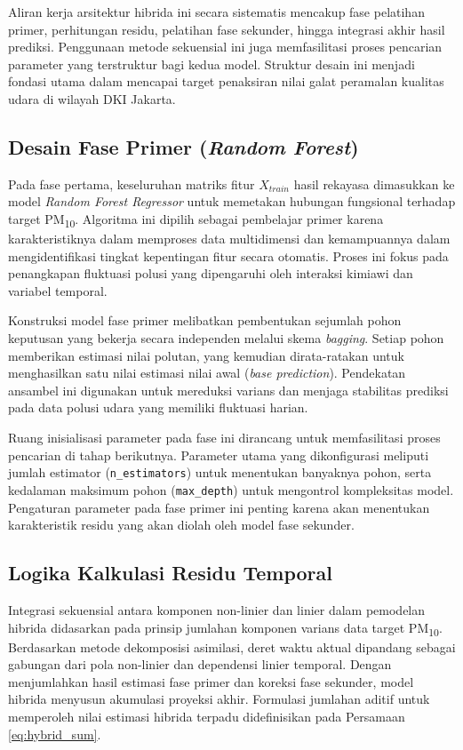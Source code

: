 Aliran kerja arsitektur hibrida ini secara sistematis mencakup fase pelatihan primer, perhitungan residu, pelatihan fase sekunder, hingga integrasi akhir hasil prediksi. Penggunaan metode sekuensial ini juga memfasilitasi proses pencarian parameter yang terstruktur bagi kedua model. Struktur desain ini menjadi fondasi utama dalam mencapai target penaksiran nilai galat peramalan kualitas udara di wilayah DKI Jakarta.

\subsection{Desain Fase Primer (\textit{Random Forest})}

Pada fase pertama, keseluruhan matriks fitur $X_{train}$ hasil rekayasa dimasukkan ke model \textit{Random Forest Regressor} untuk memetakan hubungan fungsional terhadap target PM\textsubscript{10}. Algoritma ini dipilih sebagai pembelajar primer karena karakteristiknya dalam memproses data multidimensi dan kemampuannya dalam mengidentifikasi tingkat kepentingan fitur secara otomatis. Proses ini fokus pada penangkapan fluktuasi polusi yang dipengaruhi oleh interaksi kimiawi dan variabel temporal.

Konstruksi model fase primer melibatkan pembentukan sejumlah pohon keputusan yang bekerja secara independen melalui skema \textit{bagging}. Setiap pohon memberikan estimasi nilai polutan, yang kemudian dirata-ratakan untuk menghasilkan satu nilai estimasi nilai awal (\textit{base prediction}). Pendekatan ansambel ini digunakan untuk mereduksi varians dan menjaga stabilitas prediksi pada data polusi udara yang memiliki fluktuasi harian.

Ruang inisialisasi parameter pada fase ini dirancang untuk memfasilitasi proses pencarian di tahap berikutnya. Parameter utama yang dikonfigurasi meliputi jumlah estimator (\texttt{n\_estimators}) untuk menentukan banyaknya pohon, serta kedalaman maksimum pohon (\texttt{max\_depth}) untuk mengontrol kompleksitas model. Pengaturan parameter pada fase primer ini penting karena akan menentukan karakteristik residu yang akan diolah oleh model fase sekunder.

\subsection{Logika Kalkulasi Residu Temporal}

Integrasi sekuensial antara komponen non-linier dan linier dalam pemodelan hibrida didasarkan pada prinsip jumlahan komponen varians data target PM\textsubscript{10}. Berdasarkan metode dekomposisi asimilasi, deret waktu aktual dipandang sebagai gabungan dari pola non-linier dan dependensi linier temporal. Dengan menjumlahkan hasil estimasi fase primer dan koreksi fase sekunder, model hibrida menyusun akumulasi proyeksi akhir. Formulasi jumlahan aditif untuk memperoleh nilai estimasi hibrida terpadu didefinisikan pada Persamaan \ref{eq:hybrid_sum}.

